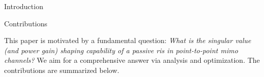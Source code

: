 \begin{section}{Introduction}
\begin{subsection}{Contributions}


		This paper is motivated by a fundamental question:
		\emph{What is the singular value (and power gain) shaping capability of a passive \gls{ris} in point-to-point \gls{mimo} channels?}
		We aim for a comprehensive answer via analysis and optimization.
		The contributions are summarized below.





\end{subsection}
\end{section}
